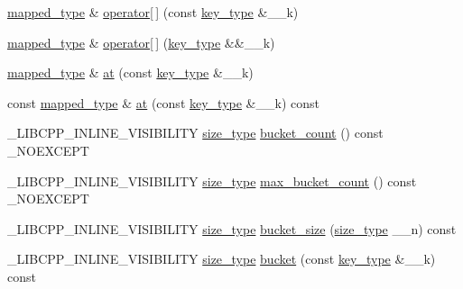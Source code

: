 \begin{DoxyCompactItemize}
\item 
\hyperlink{class__map_a652392c4150010664c8b1b76e460ae0a}{mapped\+\_\+type} \& \hyperlink{class__map_aa9ab8c7c8ffd5c3d8edc6c007dde829e}{operator\mbox{[}$\,$\mbox{]}} (const \hyperlink{class__map_a38e77c21e3aba60e817666c55ff61164}{key\+\_\+type} \&\+\_\+\+\_\+k)
\item 
\hyperlink{class__map_a652392c4150010664c8b1b76e460ae0a}{mapped\+\_\+type} \& \hyperlink{class__map_a58ee9a422104525575fd9910899580af}{operator\mbox{[}$\,$\mbox{]}} (\hyperlink{class__map_a38e77c21e3aba60e817666c55ff61164}{key\+\_\+type} \&\&\+\_\+\+\_\+k)
\item 
\hyperlink{class__map_a652392c4150010664c8b1b76e460ae0a}{mapped\+\_\+type} \& \hyperlink{class__map_ae1e2dbd3a8843be8ed0dd4bb57bef074}{at} (const \hyperlink{class__map_a38e77c21e3aba60e817666c55ff61164}{key\+\_\+type} \&\+\_\+\+\_\+k)
\item 
const \hyperlink{class__map_a652392c4150010664c8b1b76e460ae0a}{mapped\+\_\+type} \& \hyperlink{class__map_a31a079a909bedf044e83f22bd26148c3}{at} (const \hyperlink{class__map_a38e77c21e3aba60e817666c55ff61164}{key\+\_\+type} \&\+\_\+\+\_\+k) const 
\item 
\+\_\+\+L\+I\+B\+C\+P\+P\+\_\+\+I\+N\+L\+I\+N\+E\+\_\+\+V\+I\+S\+I\+B\+I\+L\+I\+T\+Y \hyperlink{class__map_adc37f621be25fda072b12873e60e9fc7}{size\+\_\+type} \hyperlink{class__map_af3d04cb16f1d8ea480fdba1b8d3160f8}{bucket\+\_\+count} () const \+\_\+\+N\+O\+E\+X\+C\+E\+P\+T
\item 
\+\_\+\+L\+I\+B\+C\+P\+P\+\_\+\+I\+N\+L\+I\+N\+E\+\_\+\+V\+I\+S\+I\+B\+I\+L\+I\+T\+Y \hyperlink{class__map_adc37f621be25fda072b12873e60e9fc7}{size\+\_\+type} \hyperlink{class__map_a665391de613aa97f8119780fec563794}{max\+\_\+bucket\+\_\+count} () const \+\_\+\+N\+O\+E\+X\+C\+E\+P\+T
\item 
\+\_\+\+L\+I\+B\+C\+P\+P\+\_\+\+I\+N\+L\+I\+N\+E\+\_\+\+V\+I\+S\+I\+B\+I\+L\+I\+T\+Y \hyperlink{class__map_adc37f621be25fda072b12873e60e9fc7}{size\+\_\+type} \hyperlink{class__map_a4f234450a2cc78fab2d942911d1d04b2}{bucket\+\_\+size} (\hyperlink{class__map_adc37f621be25fda072b12873e60e9fc7}{size\+\_\+type} \+\_\+\+\_\+n) const 
\item 
\+\_\+\+L\+I\+B\+C\+P\+P\+\_\+\+I\+N\+L\+I\+N\+E\+\_\+\+V\+I\+S\+I\+B\+I\+L\+I\+T\+Y \hyperlink{class__map_adc37f621be25fda072b12873e60e9fc7}{size\+\_\+type} \hyperlink{class__map_a11e2ab29b4d48984b5e74d7671258870}{bucket} (const \hyperlink{class__map_a38e77c21e3aba60e817666c55ff61164}{key\+\_\+type} \&\+\_\+\+\_\+k) const 
\item 

\end{DoxyCompactItemize}
